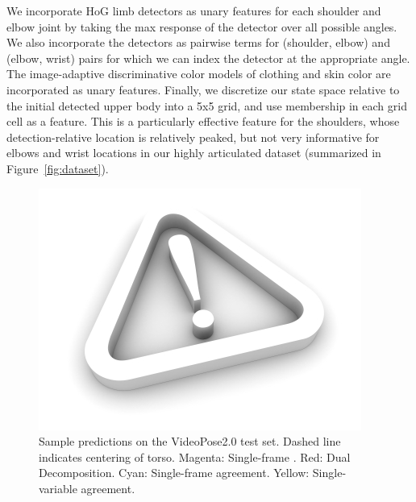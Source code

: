 We incorporate HoG limb detectors as unary features for each shoulder and elbow 
joint by taking the max response of the detector over all possible angles.  We 
also incorporate the detectors as pairwise terms for (shoulder, elbow) and 
(elbow, wrist) pairs for which we can index the detector at the appropriate 
angle.
The image-adaptive discriminative color models of clothing and skin color are 
incorporated as unary features.  Finally, we discretize our state space 
relative to the initial detected upper body into a 5x5 grid, and use membership 
in each grid cell as a feature.  This is a particularly effective feature for 
the shoulders, whose detection-relative location is relatively peaked, but not 
very informative for elbows and wrist locations in our highly articulated dataset (summarized in Figure~\ref{fig:dataset}).

\begin{figure}[]
\centering
\includegraphics[width=0.99\linewidth]{figs/empty.jpg}
\caption{\small \label{fig:dd} Sample predictions on the VideoPose2.0 test set. 
Dashed line indicates centering of torso. Magenta:
  Single-frame \cite{sapp10cascades}. Red: Dual Decomposition. Cyan:
  Single-frame agreement. Yellow: Single-variable agreement.}
\end{figure}


